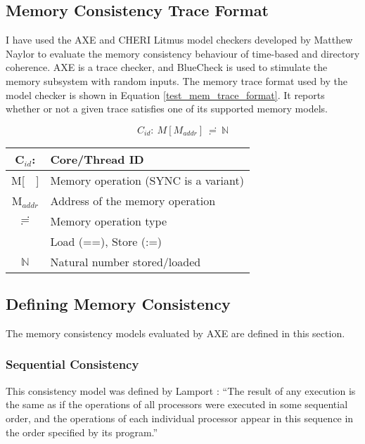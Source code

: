 	
	\subsection{Memory Consistency Trace Format}
		\label{mem_format}
	
		I have used the AXE and CHERI Litmus model checkers developed by Matthew Naylor \cite{AXE_checker,CHERI_litmus} to evaluate the memory consistency behaviour of time-based and directory coherence. AXE is a trace checker, and BlueCheck \cite{bluecheck} is used to stimulate the memory subsystem with random inputs. The memory trace format used by the model checker is shown in Equation \ref{test_mem_trace_format}. It reports whether or not a given trace satisfies one of its supported memory models.
	
		\begin{equation}
			C_{id}: \ M[M_{addr}] \ \risingdotseq \ \mathbb{N}
		\label{test_mem_trace_format}	
		\end{equation}
		
		
		\begin{table}[!h]
		\begin{center}
		\begin{tabular}{|c|l|}
			\hline
			C$_{id}$: & Core/Thread ID \\
			\hline
			M[\ \ ] & Memory operation (SYNC is a variant) \\
			\hline
			M$_{addr}$ & Address of the memory operation \\
			\hline
			$\risingdotseq$ & Memory operation type \\
			& Load (==), Store (:=) \\
			\hline
			$\mathbb{N}$ & Natural number stored/loaded \\
			\hline
		\end{tabular}
		\label{test_mem_trace_format_legend}
		\end{center}
		\end{table}
	
	\subsection{Defining Memory Consistency}
		The memory consistency models evaluated by AXE are defined in this section.

		\subsubsection{Sequential Consistency} 
			This consistency model was defined by Lamport \cite{Lamport79}: ``The result of any execution is the same as if the operations of all processors were executed in some sequential order, and the operations of each individual processor appear in this sequence in the order specified by its program.''

